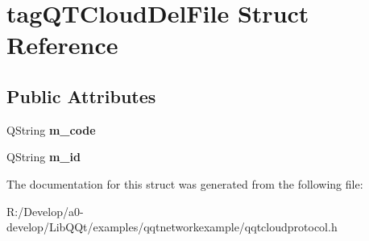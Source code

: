 \hypertarget{structtag_q_t_cloud_del_file}{}\section{tag\+Q\+T\+Cloud\+Del\+File Struct Reference}
\label{structtag_q_t_cloud_del_file}
\subsection*{Public Attributes}
\begin{DoxyCompactItemize}
\item 
\mbox{\label{structtag_q_t_cloud_del_file_aac4c5f1cea87b84d15e96d5927bdcfd3}} 
Q\+String {\bfseries m\+\_\+code}
\item 
\mbox{\label{structtag_q_t_cloud_del_file_a1f4efe4da9450a0cf05b1369f0bb10b3}} 
Q\+String {\bfseries m\+\_\+id}
\end{DoxyCompactItemize}


The documentation for this struct was generated from the following file\+:\begin{DoxyCompactItemize}
\item 
R\+:/\+Develop/a0-\/develop/\+Lib\+Q\+Qt/examples/qqtnetworkexample/qqtcloudprotocol.\+h\end{DoxyCompactItemize}
